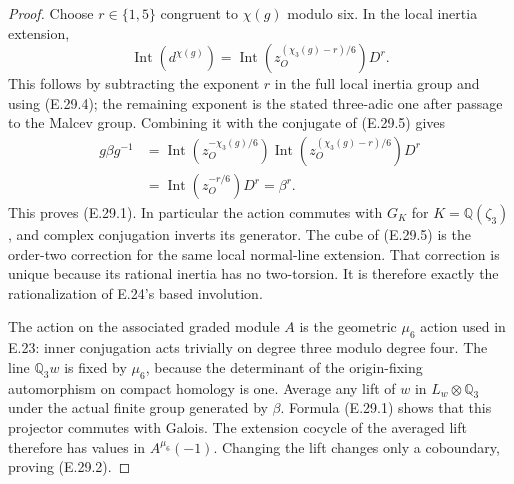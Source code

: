 \documentclass[11pt,oneside]{article}
\begin{document}
\begin{proof}
Choose $r\in\{1,5\}$ congruent to $\chi(g)$
modulo six. In the local inertia extension,
\[
 \operatorname{Int}(d^{\chi(g)})
    =\operatorname{Int}
       \left(z_O^{(\chi_3(g)-r)/6}\right)D^r.
\]
This follows by subtracting the exponent $r$ in
the full local inertia group and using (E.29.4);
the remaining exponent is the stated three-adic
one after passage to the Malcev group. Combining
it with the conjugate of (E.29.5) gives
\[
 \begin{aligned}
 g\beta g^{-1}
 &=\operatorname{Int}(z_O^{-\chi_3(g)/6})
       \operatorname{Int}
          (z_O^{(\chi_3(g)-r)/6})D^r\\
 &=\operatorname{Int}(z_O^{-r/6})D^r
   =\beta^r.
 \end{aligned}
\]
This proves (E.29.1). In particular the action
commutes with $G_K$ for $K=\mathbb Q(\zeta_3)$,
and complex conjugation inverts its generator.
The cube of (E.29.5) is the order-two correction
for the same local normal-line extension. That
correction is unique because its rational inertia
has no two-torsion. It is therefore exactly the
rationalization of E.24's based involution.

The action on the associated graded module $A$
is the geometric $\mu_6$ action used in E.23:
inner conjugation acts trivially on degree three
modulo degree four. The line $\mathbb Q_3w$
is fixed by $\mu_6$, because the determinant of
the origin-fixing automorphism on compact
homology is one. Average any lift of $w$ in
$L_w\otimes\mathbb Q_3$ under the actual finite
group generated by $\beta$. Formula (E.29.1)
shows that this projector commutes with Galois.
The extension cocycle of the averaged lift
therefore has values in $A^{\mu_6}(-1)$.
Changing the lift changes only a coboundary,
proving (E.29.2).


\end{proof}
\end{document}
